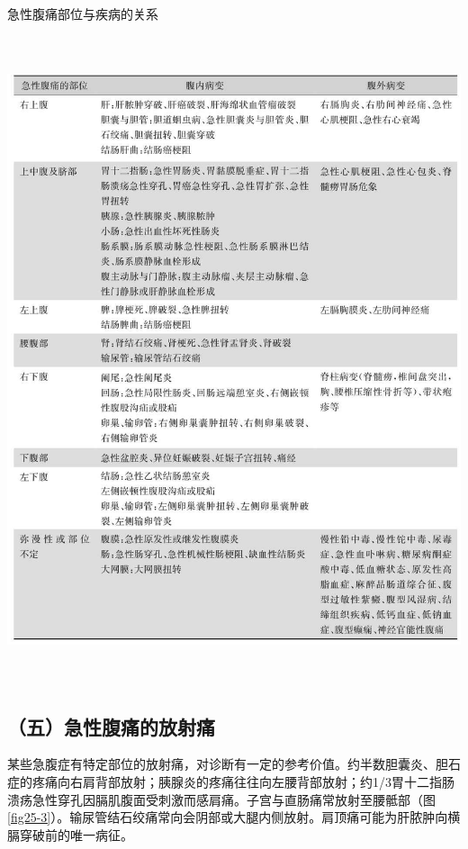 \begin{table}[htbp]
\centering
\caption{急性腹痛部位与疾病的关系}
\label{tab25-1}
\includegraphics[width=5.94792in,height=7.48958in]{./images/Image00138.jpg}
\end{table}

\subsection{（五）急性腹痛的放射痛}

某些急腹症有特定部位的放射痛，对诊断有一定的参考价值。约半数胆囊炎、胆石症的疼痛向右肩背部放射；胰腺炎的疼痛往往向左腰背部放射；约1/3胃十二指肠溃疡急性穿孔因膈肌腹面受刺激而感肩痛。子宫与直肠痛常放射至腰骶部（图\ref{fig25-3}）。输尿管结石绞痛常向会阴部或大腿内侧放射。肩顶痛可能为肝脓肿向横膈穿破前的唯一病征。

